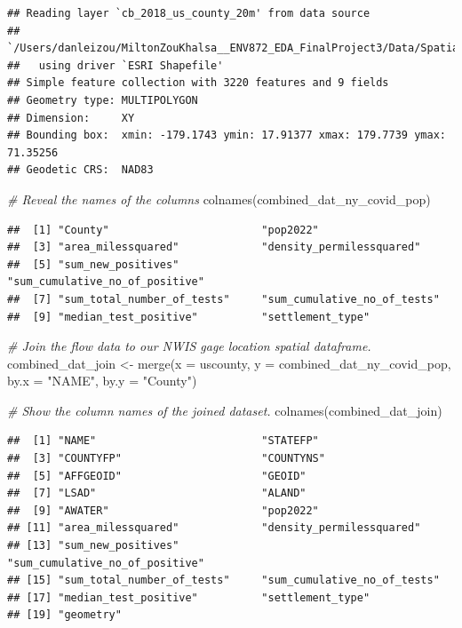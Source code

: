 \documentclass[
  12pt,
]{article}
\newenvironment{Shaded}{\begin{snugshade}}{\end{snugshade}}
\newcommand{\AttributeTok}[1]{\textcolor[rgb]{0.77,0.63,0.00}{#1}}
\newcommand{\CommentTok}[1]{\textcolor[rgb]{0.56,0.35,0.01}{\textit{#1}}}
\newcommand{\FunctionTok}[1]{\textcolor[rgb]{0.00,0.00,0.00}{#1}}
\newcommand{\NormalTok}[1]{#1}
\newcommand{\OtherTok}[1]{\textcolor[rgb]{0.56,0.35,0.01}{#1}}
\newcommand{\StringTok}[1]{\textcolor[rgb]{0.31,0.60,0.02}{#1}}
\begin{document}
\begin{verbatim}
## Reading layer `cb_2018_us_county_20m' from data source 
##   `/Users/danleizou/MiltonZouKhalsa__ENV872_EDA_FinalProject3/Data/Spatial_Files/cb_2018_us_county_20m.shp' 
##   using driver `ESRI Shapefile'
## Simple feature collection with 3220 features and 9 fields
## Geometry type: MULTIPOLYGON
## Dimension:     XY
## Bounding box:  xmin: -179.1743 ymin: 17.91377 xmax: 179.7739 ymax: 71.35256
## Geodetic CRS:  NAD83
\end{verbatim}

\begin{Shaded}
\begin{Highlighting}[]
\CommentTok{\# Reveal the names of the columns}
\FunctionTok{colnames}\NormalTok{(combined\_dat\_ny\_covid\_pop)}
\end{Highlighting}
\end{Shaded}

\begin{verbatim}
##  [1] "County"                        "pop2022"                      
##  [3] "area_milessquared"             "density_permilessquared"      
##  [5] "sum_new_positives"             "sum_cumulative_no_of_positive"
##  [7] "sum_total_number_of_tests"     "sum_cumulative_no_of_tests"   
##  [9] "median_test_positive"          "settlement_type"
\end{verbatim}

\begin{Shaded}
\begin{Highlighting}[]
\CommentTok{\# Join the flow data to our NWIS gage location spatial dataframe.}
\NormalTok{combined\_dat\_join }\OtherTok{\textless{}{-}} \FunctionTok{merge}\NormalTok{(}\AttributeTok{x =}\NormalTok{ uscounty,}
                          \AttributeTok{y =}\NormalTok{ combined\_dat\_ny\_covid\_pop,}
                          \AttributeTok{by.x =} \StringTok{"NAME"}\NormalTok{,}
                          \AttributeTok{by.y =} \StringTok{"County"}\NormalTok{)}
 
\CommentTok{\# Show the column names of the joined dataset.}
\FunctionTok{colnames}\NormalTok{(combined\_dat\_join)}
\end{Highlighting}
\end{Shaded}

\begin{verbatim}
##  [1] "NAME"                          "STATEFP"                      
##  [3] "COUNTYFP"                      "COUNTYNS"                     
##  [5] "AFFGEOID"                      "GEOID"                        
##  [7] "LSAD"                          "ALAND"                        
##  [9] "AWATER"                        "pop2022"                      
## [11] "area_milessquared"             "density_permilessquared"      
## [13] "sum_new_positives"             "sum_cumulative_no_of_positive"
## [15] "sum_total_number_of_tests"     "sum_cumulative_no_of_tests"   
## [17] "median_test_positive"          "settlement_type"              
## [19] "geometry"
\end{verbatim}
\end{document}
